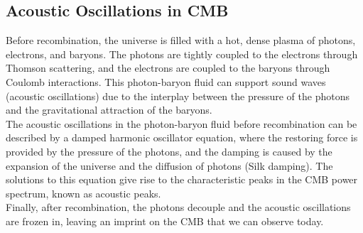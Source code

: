 \subsection{Acoustic Oscillations in CMB}
\begin{intuition}
    Before recombination, the universe is filled with a hot, dense plasma of photons, electrons, and baryons. The photons are tightly coupled to the electrons through Thomson scattering, and the electrons are coupled to the baryons through Coulomb interactions. This photon-baryon fluid can support sound waves (acoustic oscillations) due to the interplay between the pressure of the photons and the gravitational attraction of the baryons. \\

    The acoustic oscillations in the photon-baryon fluid before recombination can be described by a damped harmonic oscillator equation, where the restoring force is provided by the pressure of the photons, and the damping is caused by the expansion of the universe and the diffusion of photons (Silk damping). The solutions to this equation give rise to the characteristic peaks in the CMB power spectrum, known as acoustic peaks. \\

    Finally, after recombination, the photons decouple and the acoustic oscillations are frozen in, leaving an imprint on the CMB that we can observe today. 
\end{intuition}

